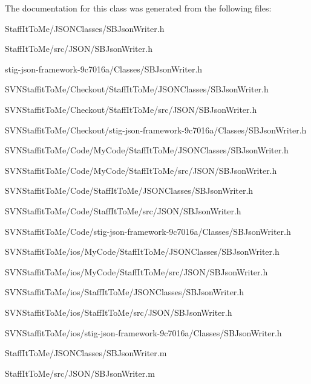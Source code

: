 \-The documentation for this class was generated from the following files\-:\begin{DoxyCompactItemize}
\item 
\-Staff\-It\-To\-Me/\-J\-S\-O\-N\-Classes/\-S\-B\-Json\-Writer.\-h\item 
\-Staff\-It\-To\-Me/src/\-J\-S\-O\-N/\-S\-B\-Json\-Writer.\-h\item 
stig-\/json-\/framework-\/9c7016a/\-Classes/\-S\-B\-Json\-Writer.\-h\item 
\-S\-V\-N\-Staffit\-To\-Me/\-Checkout/\-Staff\-It\-To\-Me/\-J\-S\-O\-N\-Classes/\-S\-B\-Json\-Writer.\-h\item 
\-S\-V\-N\-Staffit\-To\-Me/\-Checkout/\-Staff\-It\-To\-Me/src/\-J\-S\-O\-N/\-S\-B\-Json\-Writer.\-h\item 
\-S\-V\-N\-Staffit\-To\-Me/\-Checkout/stig-\/json-\/framework-\/9c7016a/\-Classes/\-S\-B\-Json\-Writer.\-h\item 
\-S\-V\-N\-Staffit\-To\-Me/\-Code/\-My\-Code/\-Staff\-It\-To\-Me/\-J\-S\-O\-N\-Classes/\-S\-B\-Json\-Writer.\-h\item 
\-S\-V\-N\-Staffit\-To\-Me/\-Code/\-My\-Code/\-Staff\-It\-To\-Me/src/\-J\-S\-O\-N/\-S\-B\-Json\-Writer.\-h\item 
\-S\-V\-N\-Staffit\-To\-Me/\-Code/\-Staff\-It\-To\-Me/\-J\-S\-O\-N\-Classes/\-S\-B\-Json\-Writer.\-h\item 
\-S\-V\-N\-Staffit\-To\-Me/\-Code/\-Staff\-It\-To\-Me/src/\-J\-S\-O\-N/\-S\-B\-Json\-Writer.\-h\item 
\-S\-V\-N\-Staffit\-To\-Me/\-Code/stig-\/json-\/framework-\/9c7016a/\-Classes/\-S\-B\-Json\-Writer.\-h\item 
\-S\-V\-N\-Staffit\-To\-Me/ios/\-My\-Code/\-Staff\-It\-To\-Me/\-J\-S\-O\-N\-Classes/\-S\-B\-Json\-Writer.\-h\item 
\-S\-V\-N\-Staffit\-To\-Me/ios/\-My\-Code/\-Staff\-It\-To\-Me/src/\-J\-S\-O\-N/\-S\-B\-Json\-Writer.\-h\item 
\-S\-V\-N\-Staffit\-To\-Me/ios/\-Staff\-It\-To\-Me/\-J\-S\-O\-N\-Classes/\-S\-B\-Json\-Writer.\-h\item 
\-S\-V\-N\-Staffit\-To\-Me/ios/\-Staff\-It\-To\-Me/src/\-J\-S\-O\-N/\-S\-B\-Json\-Writer.\-h\item 
\-S\-V\-N\-Staffit\-To\-Me/ios/stig-\/json-\/framework-\/9c7016a/\-Classes/\-S\-B\-Json\-Writer.\-h\item 
\-Staff\-It\-To\-Me/\-J\-S\-O\-N\-Classes/\-S\-B\-Json\-Writer.\-m\item 
\-Staff\-It\-To\-Me/src/\-J\-S\-O\-N/\-S\-B\-Json\-Writer.\-m\item 

\end{DoxyCompactItemize}
